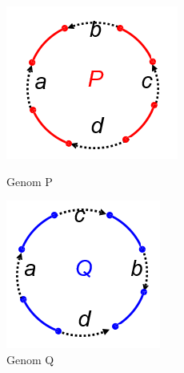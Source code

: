 \iffalse 
\begin{figure}[h!]
  \includegraphics[width=\linewidth]{poglavlja/6/slike/P.PNG}
  \caption{Genom P}
  \label{P}
\endminipage\hfill
{}
  \includegraphics[width=\linewidth]{poglavlja/6/slike/Q.PNG}
  \caption{Genom Q}
  \label{Q}
\endminipage\hfill
\end{figure}

